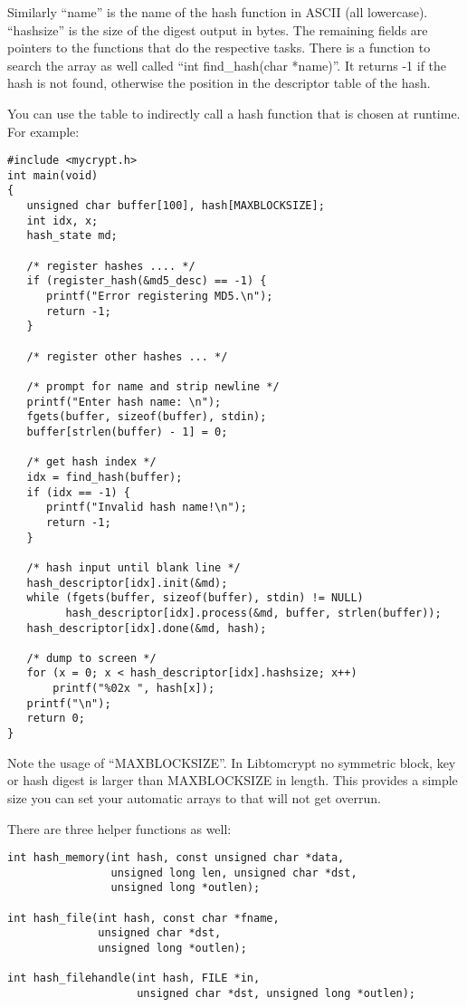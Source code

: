 \documentclass{book}
\begin{document}
Similarly ``name'' is the name of the hash function in ASCII (all lowercase).  ``hashsize'' is the size of the digest output
in bytes.  The remaining fields are pointers to the functions that do the respective tasks.  There is a function to
search the array as well called ``int find\_hash(char *name)''.  It returns -1 if the hash is not found, otherwise the
position in the descriptor table of the hash.

You can use the table to indirectly call a hash function that is chosen at runtime.  For example:
\begin{small}
\begin{verbatim}
#include <mycrypt.h>
int main(void)
{
   unsigned char buffer[100], hash[MAXBLOCKSIZE];
   int idx, x;
   hash_state md;

   /* register hashes .... */
   if (register_hash(&md5_desc) == -1) {
      printf("Error registering MD5.\n");
      return -1;
   }

   /* register other hashes ... */

   /* prompt for name and strip newline */
   printf("Enter hash name: \n");
   fgets(buffer, sizeof(buffer), stdin);
   buffer[strlen(buffer) - 1] = 0;

   /* get hash index */
   idx = find_hash(buffer);
   if (idx == -1) {
      printf("Invalid hash name!\n");
      return -1;
   }

   /* hash input until blank line */
   hash_descriptor[idx].init(&md);
   while (fgets(buffer, sizeof(buffer), stdin) != NULL)
         hash_descriptor[idx].process(&md, buffer, strlen(buffer));
   hash_descriptor[idx].done(&md, hash);

   /* dump to screen */
   for (x = 0; x < hash_descriptor[idx].hashsize; x++)
       printf("%02x ", hash[x]);
   printf("\n");
   return 0;
}
\end{verbatim}
\end{small}

Note the usage of ``MAXBLOCKSIZE''.  In Libtomcrypt no symmetric block, key or hash digest is larger than MAXBLOCKSIZE in
length.  This provides a simple size you can set your automatic arrays to that will not get overrun.

There are three helper functions as well:
 
\begin{verbatim}
int hash_memory(int hash, const unsigned char *data, 
                unsigned long len, unsigned char *dst,
                unsigned long *outlen);

int hash_file(int hash, const char *fname, 
              unsigned char *dst,
              unsigned long *outlen);

int hash_filehandle(int hash, FILE *in, 
                    unsigned char *dst, unsigned long *outlen);
\end{verbatim}
\end{document}
